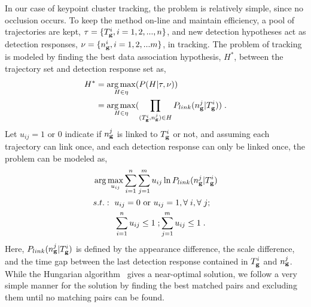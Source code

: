 \documentclass{JoITSRstyle}
\begin{document}
In our case of keypoint cluster tracking, the problem is relatively simple, since no occlusion occurs. To keep the method on-line and maintain efficiency, a pool of trajectories are kept, $\tau=\{T_{\bf{g}}^i,i=1,2,...,n\}$, and new detection hypotheses act as detection responses, $\nu=\{n_{\bf{g}}^i,i=1,2,...m\}$, in tracking. The problem of tracking is modeled by finding the best data association hypothesis, $H^*$, between the trajectory set and detection response set as,
\begin{equation}
\begin{aligned}
{H^*} &= \mathop {\arg \max }\limits_{H \in \eta
} (P(H|\tau,\nu )) \\
&= \mathop {\arg \max }\limits_{H \in \eta }
(\prod\limits_{(T_{\bf{g}}^i,n_{\bf{g}}^j) \in H} {P_{link}(n_{\bf{g}}^j|T_{\bf{g}}^i)} ) \;.
\end{aligned}
\label{eq3}
\end{equation}
Let $u_{ij}=1 \mbox{ or } 0$ indicate if $n_{\bf{g}}^j$ is linked to $T_{\bf{g}}^i$ or not, and assuming each trajectory can link once, and each detection response can only be linked once, the problem can be modeled as,
\[
\begin{aligned}
&\arg \max\limits_{u_{ij}} \sum\limits_{i = 1}^n \sum\limits_{j = 1}^m u_{ij} \ln P_{link}(n_{\bf{g}}^j|T_{\bf{g}}^i)\\
&
\begin{aligned}
    s.t.:\mbox{ }&u_{ij}=0\mbox{ or }u_{ij}=1,\forall\;i,\forall\;j;\\
    &\sum\limits_{i = 1}^n {u_{ij}} \leq 1\;; \sum\limits_{j = 1}^m {u_{ij}}\leq 1\;.
\end{aligned}
\end{aligned}
\]
Here, $P_{link}(n_{\bf{g}}^j|T_{\bf{g}}^i)$ is defined by the appearance difference, the scale difference, and the time gap between the last detection response contained in $T_{\bf{g}}^i$ and $n_{\bf{g}}^j$. While the Hungarian algorithm~\cite{ha} gives a near-optimal solution, we follow a very simple manner for the solution by finding the best matched pairs and excluding them until no matching pairs can be found.
\end{document}
